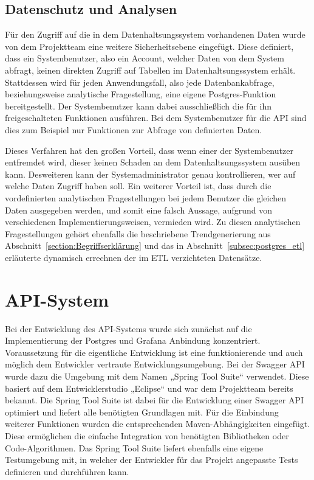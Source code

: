 \subsection{Datenschutz und Analysen}
\label{subsec:postgres_datenschutz}
Für den Zugriff auf die in dem Datenhaltsungssystem vorhandenen Daten wurde von
dem Projektteam eine weitere Sicherheitsebene eingefügt. Diese definiert, dass
ein Systembenutzer, also ein Account, welcher Daten von dem System abfragt,
keinen direkten Zugriff auf Tabellen im Datenhaltsungssystem erhält.
Stattdessen wird für jeden Anwendungsfall, also jede Datenbankabfrage,
beziehungsweise analytische Fragestellung, eine eigene Postgres\hyp{}Funktion
bereitgestellt. Der Systembenutzer kann dabei ausschließlich die für ihn
freigeschalteten Funktionen ausführen. Bei dem Systembenutzer für die API sind
dies zum Beispiel nur Funktionen zur Abfrage von definierten Daten.

Dieses Verfahren hat den großen Vorteil, dass wenn einer der Systembenutzer
entfremdet wird, dieser keinen Schaden an dem Datenhaltsungssystem ausüben
kann. Desweiteren kann der Systemadministrator genau kontrollieren, wer auf
welche Daten Zugriff haben soll. Ein weiterer Vorteil ist, dass durch die
vordefinierten analytischen Fragestellungen bei jedem Benutzer die gleichen
Daten ausgegeben werden, und somit eine falsch Aussage, aufgrund von
verschiedenen Implementierungsweisen, vermieden wird. Zu diesen analytischen
Fragestellungen gehört ebenfalls die beschriebene Trendgenerierung aus
Abschnitt~\ref{section:Begriffserklärung} und das in
Abschnitt~\ref{subsec:postgres_etl} erläuterte dynamisch errechnen der
im ETL verzichteten Datensätze.
\nl%

\section{API-System}
\label{sec:api_system}
Bei der Entwicklung des API\hyp{}Systems wurde sich zunächst auf die
Implementierung der Postgres und Grafana Anbindung konzentriert. Voraussetzung
für die eigentliche Entwicklung ist eine funktionierende und auch möglich dem
Entwickler vertraute Entwicklungsumgebung. Bei der Swagger API wurde dazu die
Umgebung mit dem Namen „Spring Tool Suite“ verwendet. Diese basiert auf dem
Entwicklerstudio „Eclipse“ und war dem Projektteam bereits bekannt. Die Spring
Tool Suite ist dabei für die Entwicklung einer Swagger API optimiert und
liefert alle benötigten Grundlagen mit. Für die Einbindung weiterer Funktionen
wurden die entsprechenden Maven\hyp{}Abhängigkeiten eingefügt. Diese
ermöglichen die einfache Integration von benötigten Bibliotheken oder
Code\hyp{}Algorithmen. Das Spring Tool Suite liefert ebenfalls eine eigene
Testumgebung mit, in welcher der Entwickler für das Projekt angepasste Tests
definieren und durchführen kann.


